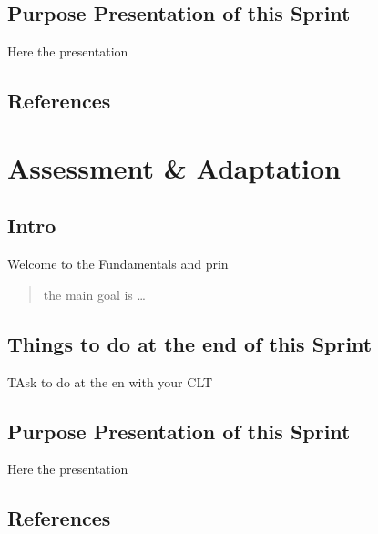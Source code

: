 \documentclass[
]{book}
\begin{document}
\hypertarget{purpose-presentation-of-this-sprint-2}{%
\section{Purpose Presentation of this Sprint}\label{purpose-presentation-of-this-sprint-2}}

Here the presentation

\hypertarget{references-3}{%
\section{References}\label{references-3}}

\hypertarget{assessment-adaptation}{%
\chapter{Assessment \& Adaptation}\label{assessment-adaptation}}

\hypertarget{intro-5}{%
\section{Intro}\label{intro-5}}

Welcome to the Fundamentals and prin

\begin{quote}
the main goal is \ldots{}
\end{quote}

\hypertarget{things-to-do-at-the-end-of-this-sprint-3}{%
\section{Things to do at the end of this Sprint}\label{things-to-do-at-the-end-of-this-sprint-3}}

TAsk to do at the en with your CLT

\hypertarget{purpose-presentation-of-this-sprint-3}{%
\section{Purpose Presentation of this Sprint}\label{purpose-presentation-of-this-sprint-3}}

Here the presentation

\hypertarget{references-4}{%
\section{References}\label{references-4}}
\end{document}
